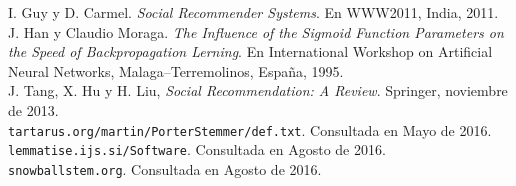 \documentclass[11pt, spanish]{report}
\begin{document}
\begin{thebibliography}{50}
  			I. Guy y D. Carmel. 
  			\textit{Social Recommender Systems}. 
  			En WWW2011, India, 2011.
  			\\
  			
  			J. Han y Claudio Moraga. 
  			\textit{The Influence of the Sigmoid Function Parameters on the Speed of Backpropagation Lerning}. 
  			En International Workshop on Artificial Neural Networks, Malaga--Terremolinos, España, 1995.
  			\\
  		
  			J. Tang, X. Hu y H. Liu, 
  			\textit{Social Recommendation: A Review}. 
  			Springer, 
  			noviembre de 2013.
  			\\
  		
  			\texttt{tartarus.org/martin/PorterStemmer/def.txt}.
  			Consultada en Mayo de 2016.
  			\\
  			
  			\texttt{lemmatise.ijs.si/Software}.
  			Consultada en Agosto de 2016.
  			\\
  	
  			\texttt{snowballstem.org}.
  			Consultada en Agosto de 2016.
  			\\
  			
  			
	\end{thebibliography}
		
	\appendix
\end{document}
